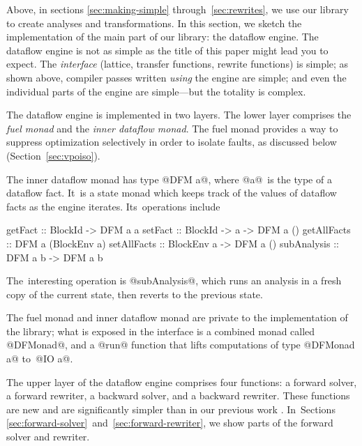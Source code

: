 \documentclass[blockstyle,preprint,natbib,nocopyrightspace]{sigplanconf}
\let\cite\citep
\newcommand{\authornote}[1]{{\em #1}}
\def\authornote#1{\unskip\relax}
\newcommand{\simon}[1]{\authornote{SLPJ: #1}}
\newcommand{\norman}[1]{\authornote{NR: #1}}
\let\remark\norman
\newcommand{\john}[1]{\authornote{JD: #1}}
\newcommand\secref[1]{Section~\ref{sec:#1}}
\newcommand\secreftwo[2]{Sections \ref{sec:#1}~and~\ref{sec:#2}}
\begin{document}
Above, in sections \ref{sec:making-simple}
through~\ref{sec:rewrites},
we use our library to create analyses and transformations.
In this section, we sketch the implementation of the main part of our
library: the dataflow engine.
The dataflow engine is not as simple as the title of this paper might
lead you to expect.
The \emph{interface} (lattice, transfer functions, rewrite functions) is simple;
as shown above, compiler passes written \emph{using} the engine
are simple;
and even the individual parts of the engine are simple---but the
totality is complex.

\remark{Simon asked what new insights are gained.
Compared with our earlier work, using CPS dramatically simplifies the
dataflow engine.}

The dataflow engine is implemented in two layers.
The lower layer comprises the \emph{fuel monad} and the \emph{inner dataflow monad}.
The fuel monad provides a way to suppress
optimization selectively in order to isolate faults, as discussed
below (\secref{vpoiso}). 

The inner dataflow monad has type @DFM a@, where @a@~is the type of a
dataflow fact.
It~is a state monad which keeps track of the values of dataflow facts
as the engine iterates.
Its~operations include %
\begin{code}
getFact     :: BlockId -> DFM a a
setFact     :: BlockId -> a -> DFM a ()
getAllFacts :: DFM a (BlockEnv a)
setAllFacts :: BlockEnv a -> DFM a ()
subAnalysis :: DFM a b -> DFM a b
\end{code}
The~interesting operation is @subAnalysis@, which
runs an analysis in a fresh copy of the current state, then reverts to
the previous state.

The fuel monad and inner dataflow monad are private to the
implementation of the library; 
what is exposed in the interface is a combined monad called @DFMonad@,
and a @run@ function that lifts computations of type @DFMonad a@
to~@IO a@. \simon{``combined''??  There is no fuel moand in Fig 8!}

The upper layer of the dataflow engine comprises four functions:
a forward solver, a forward rewriter,
a backward solver, and a backward rewriter.
These functions are new and are significantly simpler than in our
previous work \cite{ramsey-dias:applicative-flow-graph}.
In~\secreftwo{forward-solver}{forward-rewriter},
we show parts of the forward solver and rewriter. 
\end{document}
